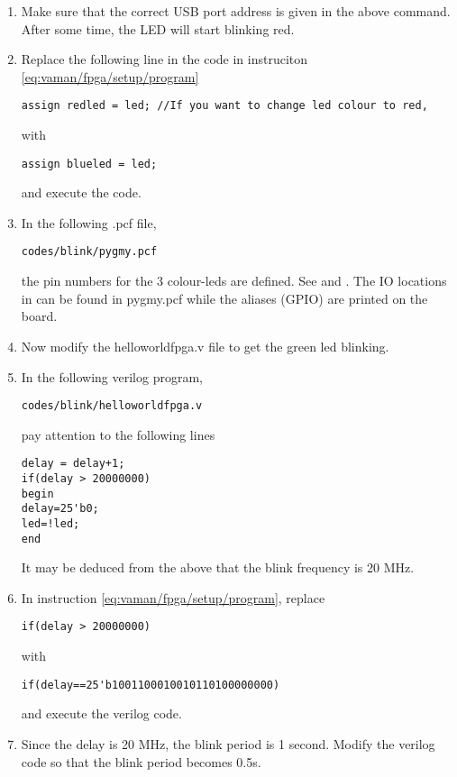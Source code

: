 \begin{enumerate}[label=\arabic*.,ref=\theenumi]
\begin{lstlisting}
\end{lstlisting}
\item Make sure that the correct USB port address is given in the above command.    After some time, the LED will start blinking red.
\item Replace  the following line in the code in instruciton  \ref{eq:vaman/fpga/setup/program} 
\begin{lstlisting}
assign redled = led; //If you want to change led colour to red,
\end{lstlisting}
with
\begin{lstlisting}
assign blueled = led; 
\end{lstlisting}
and execute the code.
\item In the following .pcf file,
\begin{lstlisting}
codes/blink/pygmy.pcf
\end{lstlisting}
the pin numbers for the 3 colour-leds are defined.  See 
and
.  The IO locations in 
		 can be found in pygmy.pcf while the aliases (GPIO) are printed on the board.
\item Now modify the helloworldfpga.v  file to get the green led blinking.
\item In the following verilog program, 
\label{eq:vaman/fpga/setup/program}
\begin{lstlisting}
codes/blink/helloworldfpga.v
\end{lstlisting}
pay attention to the following lines
\begin{lstlisting}
delay = delay+1;                                                                                                   
if(delay > 20000000)
begin
delay=25'b0;
led=!led;
end
\end{lstlisting}
It may be deduced from the above that the blink frequency is 20 MHz.
\item In instruction  \ref{eq:vaman/fpga/setup/program}, replace
\label{eq:vaman/fpga/setup/binary}
\begin{lstlisting}
if(delay > 20000000)
\end{lstlisting}
%
with
\begin{lstlisting}
if(delay==25'b1001100010010110100000000)
\end{lstlisting}
and execute the verilog code.
\item Since the delay is 20 MHz, the blink period is 1 second.  Modify the verilog code
so that the blink period becomes 0.5s.

\end{enumerate}
